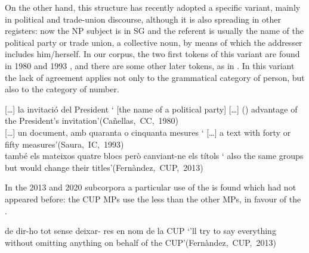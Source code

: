 \documentclass[output=paper]{langscibook}
\begin{document}
\begin{sloppypar}
On the other hand, this structure has recently adopted a specific variant, mainly in political and trade-union discourse, although it is also spreading in other registers: now the NP subject is in SG and the referent is usually the name of the political party or trade union, a collective noun, by means of which the addresser includes him/herself. In our corpus, the two first tokens of this variant are found in 1980  and 1993 , and there are some other later tokens, as in . In this variant the lack of agreement applies not only to the grammatical category of person, but also to the category of number.
\end{sloppypar}


\ea\label{ex:nogue:10}
 \ea\label{ex:nogue:10a}
 {  } […]  {la invitació del President}
\glt ` [the name of a political party] […]  () advantage of the President’s invitation'\hfill\hbox{(Cañellas, CC, 1980)}\\

 \ex\label{ex:nogue:10b}
 {    } […] {un document, amb quaranta o cinquanta mesures}
\glt `    […]     a text with forty or fifty measures'\hfill\hbox{(Saura, IC, 1993)}\\

 \ex\label{ex:nogue:10c}
 { } {també}  {els mateixos quatre blocs però canviant-ne els títols}
\glt `      also  the same groups but would change their titles'\hfill\hbox{(Fernàndez, CUP, 2013)}\\
\z 
\z 

\label{sec:nogue:2.1.2.2}

In the 2013 and 2020 subcorpora a particular use of the  is found which had not appeared before: the CUP MPs use the  less than the other MPs, in favour of the  .

\ea\label{ex:nogue:11}
 \ea\label{ex:nogue:11a}
 { de dir-ho tot sense deixar- res en nom de la CUP}
\glt `’ll try to say everything without omitting anything on behalf of the CUP'\hfill\hbox{(Fernàndez, CUP, 2013)}\\
\end{document}
